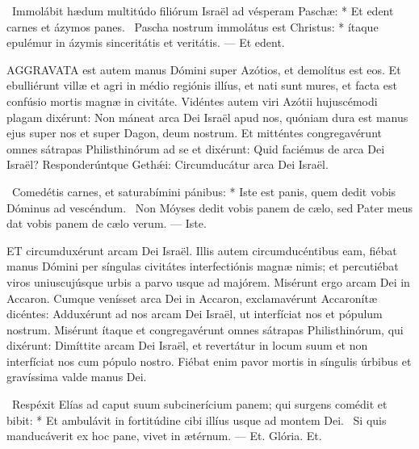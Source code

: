\R\ Immolábit hædum multitúdo filiórum Israël ad vésperam Paschæ: * Et edent carnes et ázymos panes. \V\ Pascha nostrum immolátus est Christus: * ítaque epulémur in ázymis sinceritátis et veritátis. --- Et edent.


\lettrine[lines=2]{A}{GGRAVATA} est autem manus Dómini super Azótios, et demolítus est eos. Et ebulliérunt villæ et agri in médio regiónis illíus, et nati sunt mures, et facta est confúsio mortis magnæ in civitáte. Vidéntes autem viri Azótii hujuscémodi plagam dixérunt: Non máneat arca Dei Israël apud nos, quóniam dura est manus ejus super nos et super Dagon, deum nostrum. Et mitténtes congregavérunt omnes sátrapas Philisthinórum ad se et dixérunt: Quid faciémus de arca Dei Israël? Responderúntque Gethǽi: Circumducátur arca Dei Israël.

\R\ Comedétis carnes, et saturabímini pánibus: * Iste est panis, quem dedit vobis Dóminus ad vescéndum. \V\ Non Móyses dedit vobis panem de cælo, sed Pater meus dat vobis panem de cælo verum. --- Iste.


\lettrine[lines=2]{E}{T} circumduxérunt arcam Dei Israël. Illis autem circumducéntibus eam, fiébat manus Dómini per síngulas civitátes interfectiónis magnæ nimis; et percutiébat viros uniuscujúsque urbis a parvo usque ad majórem. Misérunt ergo arcam Dei in Accaron. Cumque venísset arca Dei in Accaron, exclamavérunt Accaronítæ dicéntes: Adduxérunt ad nos arcam Dei Israël, ut interfíciat nos et pópulum nostrum. Misérunt ítaque et congregavérunt omnes sátrapas Philisthinórum, qui dixérunt: Dimíttite arcam Dei Israël, et revertátur in locum suum et non interfíciat nos cum pópulo nostro. Fiébat enim pavor mortis in síngulis úrbibus et gravíssima valde manus Dei.

\R\ Respéxit Elías ad caput suum subcinerícium panem; qui surgens comédit et bibit: * Et ambulávit in fortitúdine cibi illíus usque ad montem Dei. \V\ Si quis manducáverit ex hoc pane, vivet in ætérnum. --- Et. Glória. Et.





